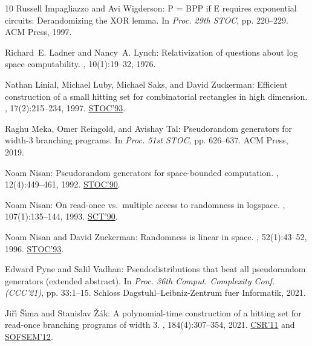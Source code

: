 \begin{thebibliography}{10}
{\sc Russell Impagliazzo and Avi Wigderson}: {P} = {BPP} if {E} requires
  exponential circuits: Derandomizing the {XOR} lemma.
\newblock In {\em Proc. 29th STOC}, pp. 220--229. ACM Press, 1997.
\newblock [\epfmtdoi{10.1145/258533.258590}]

{\sc Richard~E. Ladner and Nancy~A. Lynch}: Relativization of questions about
  log space computability.
, 10(1):19--32, 1976.
\newblock [\epfmtdoi{10.1007/BF01683260}]

{\sc Nathan Linial, Michael Luby, Michael Saks, and David Zuckerman}: Efficient
  construction of a small hitting set for combinatorial rectangles in high
  dimension.
, 17(2):215--234, 1997.
\newblock \prelim \href{https://doi.org/10.1145/167088.167166}{STOC'93}.
\newblock [\epfmtdoi{10.1007/BF01200907}]

{\sc Raghu Meka, Omer Reingold, and Avishay Tal}: Pseudorandom generators for
  width-3 branching programs.
\newblock In {\em Proc. 51st STOC}, pp. 626--637. ACM Press, 2019.

{\sc Noam Nisan}: Pseudorandom generators for space-bounded computation.
, 12(4):449--461, 1992.
\newblock \prelim \href{https://doi.org/10.1145/100216.100242}{STOC'90}.
\newblock [\epfmtdoi{10.1007/BF01305237}]

{\sc Noam Nisan}: On read-once vs.\ multiple access to randomness in logspace.
, 107(1):135--144, 1993.
\newblock \prelim \href{https://doi.org/10.1109/SCT.1990.113966}{SCT'90}.
\newblock [\epfmtdoi{10.1016/0304-3975(93)90258-U}]

{\sc Noam Nisan and David Zuckerman}: Randomness is linear in space.
, 52(1):43--52, 1996.
\newblock \prelim \href{https://doi.org/10.1145/167088.167162}{STOC'93}.

{\sc Edward Pyne and Salil Vadhan}: Pseudodistributions that beat all
  pseudorandom generators (extended abstract).
\newblock In {\em Proc. 36th Comput. Complexity Conf. (CCC'21)}, pp. 33:1--15.
  Schloss Dagstuhl--Leibniz-Zentrum fuer Informatik, 2021.

{\sc Ji\v{r}\'{\i} {\v{S}}\'{\i}ma and Stanislav {\v{Z}}\'{a}k}: A
  polynomial-time construction of a hitting set for read-once branching
  programs of width 3.
, 184(4):307--354, 2021.
\newblock \prelims \href{https://doi.org/10.1007/978-3-642-20712-9_10}{CSR'11}
  and \href{https://doi.org/10.1007/978-3-642-27660-6_33}{SOFSEM'12}.

\end{thebibliography}